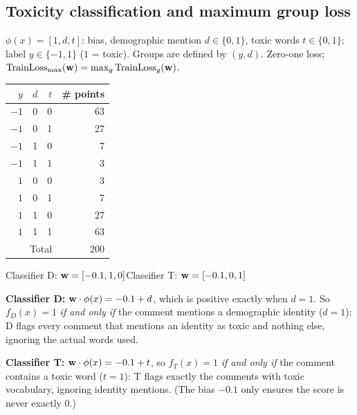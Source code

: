 \subsection{Toxicity classification and maximum group loss}

$\phi(x)=[1,d,t]$: bias, demographic mention $d\in\{0,1\}$, toxic words $t\in\{0,1\}$; label $y\in\{-1,1\}$
($1$ = toxic). Groups are defined by $(y,d)$. Zero-one loss;
$\text{TrainLoss}_{\max}(\mathbf{w})=\max_g\text{TrainLoss}_g(\mathbf{w})$.

\begin{center}
\begin{tabular}{rrrr}
\toprule
$y$ & $d$ & $t$ & \# points\\
\midrule
$-1$&0&0&63\\ $-1$&0&1&27\\ $-1$&1&0&7\\ $-1$&1&1&3\\
$1$&0&0&3\\ $1$&0&1&7\\ $1$&1&0&27\\ $1$&1&1&63\\
\midrule
\multicolumn{3}{r}{Total} & 200\\
\bottomrule
\end{tabular}
\qquad
Classifier D: $\mathbf{w}=[-0.1,1,0]$\quad Classifier T: $\mathbf{w}=[-0.1,0,1]$
\end{center}

\begin{solution}
\textbf{Classifier D:} $\mathbf{w}\cdot\phi(x)=-0.1+d$, which is positive exactly when $d=1$. So
$f_D(x)=1$ \emph{if and only if} the comment mentions a demographic identity ($d=1$): D flags every comment
that mentions an identity as toxic and nothing else, ignoring the actual words used.

\textbf{Classifier T:} $\mathbf{w}\cdot\phi(x)=-0.1+t$, so $f_T(x)=1$ \emph{if and only if} the comment contains a
toxic word ($t=1$): T flags exactly the comments with toxic vocabulary, ignoring identity mentions.
(The bias $-0.1$ only ensures the score is never exactly $0$.)
\end{solution}

